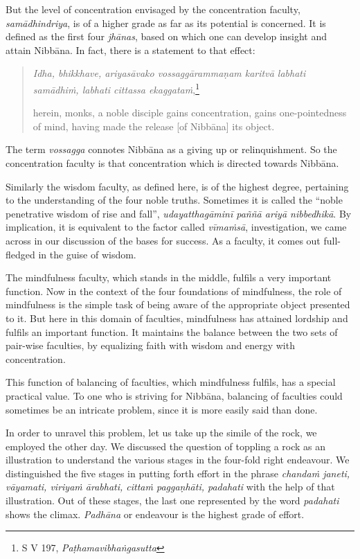 But the level of concentration envisaged by the concentration faculty, \emph{samādhindriya}, is of a higher grade as far as its potential is concerned. It is defined as the first four \emph{jhānas}, based on which one can develop insight and attain Nibbāna. In fact, there is a statement to that effect:

\begin{quote}
\emph{Idha, bhikkhave, ariyasāvako vossaggārammaṇam karitvā labhati samādhiṁ, labhati cittassa ekaggataṁ},\footnote{S V 197, \emph{Paṭhamavibhaṅgasutta}}

herein, monks, a noble disciple gains concentration, gains one-pointedness of mind, having made the release {[}of Nibbāna{]} its object.
\end{quote}

The term \emph{vossagga} connotes Nibbāna as a giving up or relinquishment. So the concentration faculty is that concentration which is directed towards Nibbāna.

Similarly the wisdom faculty, as defined here, is of the highest degree, pertaining to the understanding of the four noble truths. Sometimes it is called the ``noble penetrative wisdom of rise and fall'', \emph{udayatthagāminī paññā ariyā nibbedhikā}. By implication, it is equivalent to the factor called \emph{vīmaṁsā}, investigation, we came across in our discussion of the bases for success. As a faculty, it comes out full-fledged in the guise of wisdom.

The mindfulness faculty, which stands in the middle, fulfils a very important function. Now in the context of the four foundations of mindfulness, the role of mindfulness is the simple task of being aware of the appropriate object presented to it. But here in this domain of faculties, mindfulness has attained lordship and fulfils an important function. It maintains the balance between the two sets of pair-wise faculties, by equalizing faith with wisdom and energy with concentration.

This function of balancing of faculties, which mindfulness fulfils, has a special practical value. To one who is striving for Nibbāna, balancing of faculties could sometimes be an intricate problem, since it is more easily said than done.

In order to unravel this problem, let us take up the simile of the rock, we employed the other day. We discussed the question of toppling a rock as an illustration to understand the various stages in the four-fold right endeavour. We distinguished the five stages in putting forth effort in the phrase \emph{chandaṁ janeti, vāyamati, viriyaṁ ārabhati, cittaṁ paggaṇhāti, padahati} with the help of that illustration. Out of these stages, the last one represented by the word \emph{padahati} shows the climax. \emph{Padhāna} or endeavour is the highest grade of effort.

